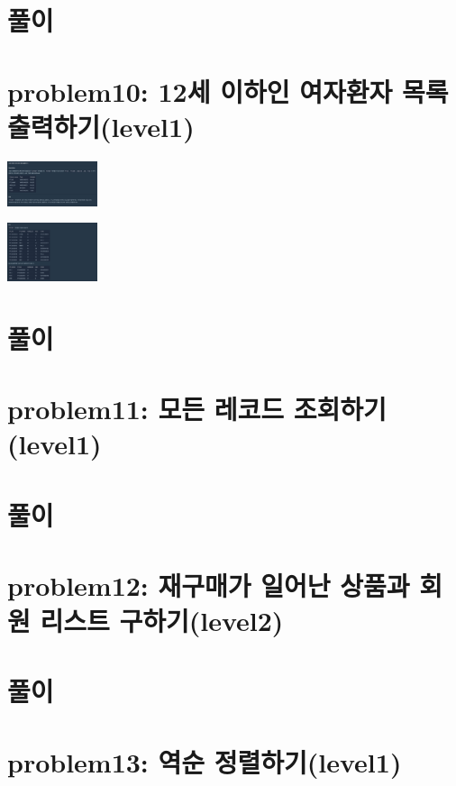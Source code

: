 \documentclass[11pt]{article}
\begin{document}
\section*{풀이}
\label{sec:orgdf37db0}


\section*{problem10: 12세 이하인 여자환자 목록 출력하기(level1)}
\label{sec:org7cd0a7a}
\begin{center}
\includegraphics[width=100px]{../static/img/sql/p10-1.png}
\end{center}

\begin{center}
\includegraphics[width=100px]{../static/img/sql/p10-2.png}
\end{center}
\section*{풀이}
\label{sec:org60ebf7a}

\section*{problem11: 모든 레코드 조회하기(level1)}
\label{sec:org4be1dff}
\section*{풀이}
\label{sec:org0b831df}

\section*{problem12: 재구매가 일어난 상품과 회원 리스트 구하기(level2)}
\label{sec:orgfcace0b}
\section*{풀이}
\label{sec:orgb9235ce}

\section*{problem13: 역순 정렬하기(level1)}
\label{sec:orgcc2d5b7}
\end{document}
